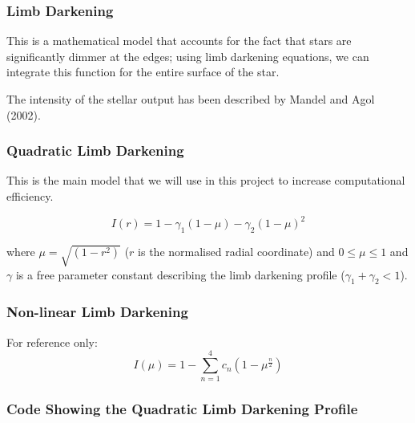 \documentclass[11pt]{article}
\begin{document}
    \hypertarget{limb-darkening}{%
\subsubsection{Limb Darkening}\label{limb-darkening}}

This is a mathematical model that accounts for the fact that stars are significantly dimmer at the edges; using limb darkening equations, we can integrate this function for the entire surface of the star.

The intensity of the stellar output has been described by Mandel and Agol (2002).

\hypertarget{quadratic-limb-darkening}{%
\subsubsection{Quadratic Limb Darkening}\label{quadratic-limb-darkening}}

This is the main model that we will use in this project to increase
computational efficiency.

\begin{equation*}
I(r) = 1 - \gamma_{1}(1 - \mu) - \gamma_{2}(1 - \mu)^{2}
\end{equation*}

where \(\mu = \sqrt{(1 - r^{2})}\) (\(r\) is the normalised radial
coordinate) and \(0 \leqslant \mu \leqslant 1\) and \(\gamma\) is a free
parameter constant describing the limb darkening profile
(\(\gamma_{1} + \gamma_{2} < 1\)).

\hypertarget{non-linear-limb-darkening}{%
\subsubsection{Non-linear Limb Darkening}\label{non-linear-limb-darkening}}

For reference only: 
\begin{equation*}
I(\mu) = 1 - \sum_{n = 1}^{4} c_{n}(1 - \mu^{\frac{n}{2}})
\end{equation*}

    \hypertarget{code-showing-the-quadratic-limb-darkening-profile}{%
\subsubsection{Code Showing the Quadratic Limb Darkening Profile}\label{code-showing-the-quadratic-limb-darkening-profile}}
\end{document}
